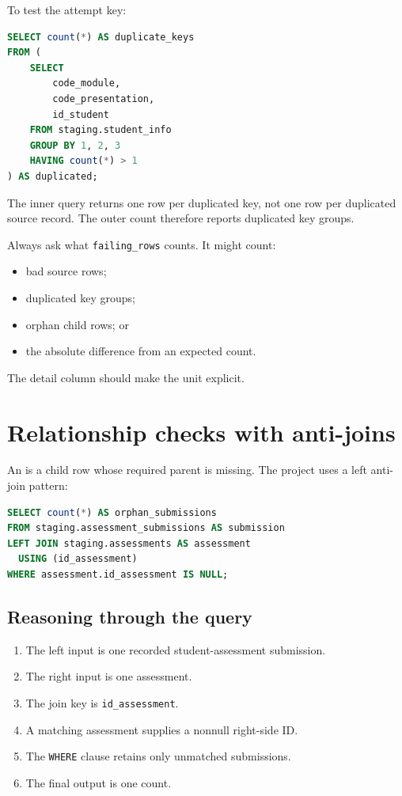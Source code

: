 To test the attempt key:

\begin{lstlisting}[language=SQL]
SELECT count(*) AS duplicate_keys
FROM (
    SELECT
        code_module,
        code_presentation,
        id_student
    FROM staging.student_info
    GROUP BY 1, 2, 3
    HAVING count(*) > 1
) AS duplicated;
\end{lstlisting}

The inner query returns one row per duplicated key, not one row per duplicated
source record. The outer count therefore reports duplicated key groups.

\begin{validationbox}
Always ask what \texttt{failing\_rows} counts. It might count:
\begin{itemize}
  \item bad source rows;
  \item duplicated key groups;
  \item orphan child rows; or
  \item the absolute difference from an expected count.
\end{itemize}
The detail column should make the unit explicit.
\end{validationbox}

\section{Relationship checks with anti-joins}

An  is a child row whose required parent is missing. The project
uses a left anti-join pattern:

\begin{lstlisting}[language=SQL]
SELECT count(*) AS orphan_submissions
FROM staging.assessment_submissions AS submission
LEFT JOIN staging.assessments AS assessment
  USING (id_assessment)
WHERE assessment.id_assessment IS NULL;
\end{lstlisting}

\subsection{Reasoning through the query}

\begin{enumerate}
  \item The left input is one recorded student-assessment submission.
  \item The right input is one assessment.
  \item The join key is \texttt{id\_assessment}.
  \item A matching assessment supplies a nonnull right-side ID.
  \item The \texttt{WHERE} clause retains only unmatched submissions.
  \item The final output is one count.
\end{enumerate}

